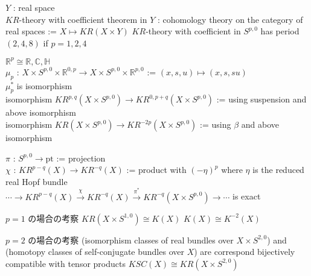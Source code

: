\documentclass[dvipdfmx]{jsarticle}
\begin{document}
\begin{Theorem}
\itemprop
  \For \(Y\) : real space \\
  \Define \(KR\)-theory with coefficient theorem in \(Y\) : cohomology theory on the category of real spaces := \(X \mapsto KR(X \times Y)\)
\itemprop
  \Then \(KR\)-theory with coefficient in \(S^{p,0}\) has period \((2,4,8)\) if \(p = 1,2,4\)
\end{Theorem}

\begin{Proof}
\itemprof
  \Let \(\mathbb{R}^{p} \cong \mathbb{R}, \mathbb{C}, \mathbb{H}\) \\
  \Let \(\mu_{p}\) : \(X \times S^{p,0} \times \mathbb{R}^{0,p} \to X \times S^{p,0} \times \mathbb{R}^{p,0}\) := \((x,s,u) \mapsto (x,s,su)\) \\
  \Then \(\mu_{p}^{*}\) is isomorphism \\
  \Let isomorphism \(KR^{p,q}(X \times S^{p,0}) \to KR^{0,p+q}(X \times S^{p,0})\) := using suspension and above isomorphism \\
  \Let isomorphism \(KR(X \times S^{p,0}) \to KR^{-2p}(X \times S^{p,0})\) := using \(\beta\) and above isomorphism
\end{Proof}

\begin{Theorem}
\itemprop
  \Let \(\pi\) : \(S^{p,0} \to \text{pt}\) := projection \\
  \Let \(\chi\) : \(KR^{p-q}(X) \to KR^{-q}(X)\) := product with \((-\eta)^{p}\) where \(\eta\) is the reduced real Hopf bundle \\
  \Then \(\cdots \to KR^{p-q}(X) \overset{\chi}{\to} KR^{-q}(X) \overset{\pi^*}{\to} KR^{-q}(X \times S^{p,0}) \to \cdots \) is exact
\end{Theorem}

\begin{Theorem}
\itemnote
  \(p=1\) の場合の考察
\itemprop
  \(KR(X \times S^{1,0}) \cong K(X)\)
\itemprop
  \(K(X) \cong K^{-2}(X)\)
\end{Theorem}

\begin{Theorem}
\itemnote
  \(p=2\) の場合の考察
\itemprop
  (isomorphism classes of real bundles over \(X \times S^{2,0}\)) and (homotopy classes of self-conjugate bundles over \(X\)) are correspond bijectively compatible with tensor products
\itemprop
  \(KSC(X) \cong KR(X \times S^{2,0})\)
\end{Theorem}
\end{document}
